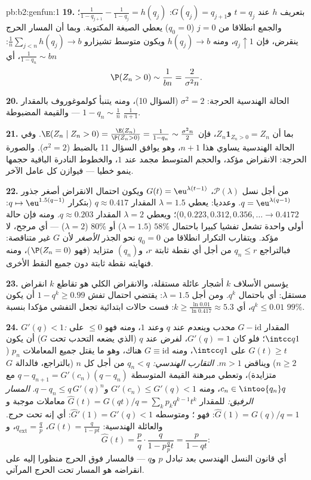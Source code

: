 \begin{solution}{pb:b2:genfun:1}
\textbf{19.} بتعريف $h$ عند $t = q_j$ و$G(q_j) =
q_{j+1}$: $\frac1{1 - q_{j+1}} - \frac1{1-q_j} = h(q_j)$؛ والجمع
انطلاقا من $j = 0$ ($q_0 = 0$) يعطي الصيغة المكتوبة. وبما أن المسار
الحرج ينقرض، فإن $q_j \uparrow 1$، ومنه $h(q_j) \to
b$ ويكون متوسط تشيزارو $\frac1n\sum_{j<n}h(q_j) \to b$:
$\frac1{1-q_n} \sim bn$، أي
\[
\P(Z_n > 0) \sim \frac1{bn} = \frac{2}{\sigma^2 n} .
\]

\textbf{20.} الحالة الهندسية الحرجة: $\sigma^2 = 2$ (السؤال 10)، ومنه يتنبأ
كولموغوروف بالمقدار $1 - q_n \sim \frac1n$ --- والقيمة المضبوطة $\frac1{n+1}$.

\textbf{21.} بما أن $Z_n\mathbf 1_{Z_n > 0} = Z_n$، فإن $\E(Z_n
\mid Z_n > 0) = \frac{\E(Z_n)}{\P(Z_n > 0)} = \frac1{1 -
q_n} \sim \frac{\sigma^2n}2$. وفي الحالة الهندسية يساوي
هذا $n + 1$، وهو يوافق السؤال 11 بالضبط ($\sigma^2 = 2$). والصورة الحرجة:
الانقراض مؤكد، والحجم المتوسط مجمد عند $1$، والخطوط النادرة
الباقية حجمها ينمو خطيا --- فيوازن كل عامل الآخر.

\textbf{22.} من أجل نسل $\mathcal P(\lambda)$، $G(t) =
\eu^{\lambda(t-1)}$ ويكون احتمال الانقراض أصغر
جذور $q = \eu^{\lambda(q-1)}$. وعدديا: يعطي $\lambda = 1.5$ المقدار $q \approx 0.417$ (بتكرار $q \mapsto
\eu^{1.5(q-1)}$:
$0, 0.223, 0.312, 0.356, \dots \to 0.4172$)؛ ويعطي $\lambda = 2$ المقدار $q \approx 0.203$. ومنه فإن حالة أولى واحدة
تشعل تفشيا كبيرا باحتمال $58\%$ ($\lambda = 1.5$) أو $80\%$ ($\lambda = 2$) ---
أي مرجح، لا مؤكد. ويتقارب التكرار انطلاقا من $q_0 = 0$ نحو الجذر
\emph{الأصغر} لأن $G$ غير متناقصة: فبالتراجع $q_n \leq r$ من أجل أي
نقطة ثابتة $r$، و$(q_n)$ متزايد (فهو $\P(Z_n = 0)$)، ومنه فنهايته نقطة
ثابتة دون جميع النقط الأخرى.

\textbf{23.} يؤسس الأسلاف $k$ أشجار عائلة مستقلة، والانقراض
الكلي هو تقاطع $k$  انقراض مستقل: أي باحتمال $q^k$. ومن أجل
$\lambda = 1.5$: يقتضي احتمال تفش $1 - q^k \geq 0.99$ أن يكون $q^k \leq 0.01$، أي $k \geq
\frac{\ln 0.01}{\ln 0.417} \approx 5.3$: فست
حالات ابتدائية تجعل التفشي مؤكدا بنسبة $99\%$.

\textbf{24.} \emph{$G'(q) < 1$:} المقدار $G - \mathrm{id}$ محدب وينعدم عند $q$
وعند $1$، ومنه فهو $\leq 0$ على $\intcc
q1$؛ فلو كان $G'(q) = 1$، لفرض
 عند $q$ (الذي يضعه التحدب تحت $G$) أن يكون $G(t) \geq t$
على $\intcc q1$، ومنه $G \equiv \mathrm{id}$ هناك، وهو ما يقتل جميع المعاملات $p_n$
($n \geq 2$) ويناقض $m > 1$. \emph{التقارب الهندسي:} $q_n < q$ من أجل كل
$n$ (بالتراجع، فالدالة $G$ متزايدة)، وتعطي مبرهنة القيمة
المتوسطة $q - q_{n+1} =
G'(c_n)(q - q_n)$ مع $c_n \in \intoo{q_n}q$، ومنه $G'(c_n)
\leq G'(q) < 1$ و$q - q_n \leq q\,G'(q)^n$.
\emph{المسار الرفيق:} للمقدار $\widehat G(t) = G(qt)/q =
\sum_kp_kq^{k-1}t^k$ معاملات موجبة و$\widehat G(1) = G(q)/q = 1$: فهو
؛ ومتوسطه $\widehat
G'(1) = G'(q) < 1$: أي إنه تحت حرج. والعائلة الهندسية:
$G(t) =
\frac{q}{1-pt}$، $q_{\mathrm{ext}} = \frac qp$، و
\[
\widehat G(t) = \frac pq\cdot\frac{q}{1 - p\frac qp t}
= \frac{p}{1 - qt} :
\]
أي قانون النسل الهندسي بعد تبادل $p$ و$q$ --- فالمسار فوق
الحرج منظورا إليه على  انقراضه هو المسار تحت الحرج المرآتي.


\end{solution}
